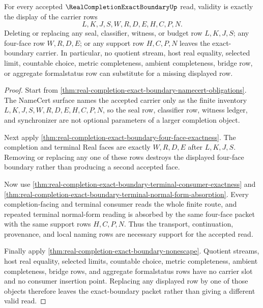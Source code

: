 \begin{theorem}
\label{thm:real-completion-exact-boundary-all-rows-necessary}
For every accepted $\RealCompletionExactBoundaryUp$ read, validity is exactly
the display of the carrier rows
$$
L,K,J,S,W,R,D,E,H,C,P,N.
$$
Deleting or replacing any seal, classifier, witness, or budget row $L,K,J,S$;
any four-face row $W,R,D,E$; or any support row $H,C,P,N$ leaves the
exact-boundary carrier. In particular, no quotient stream, host real equality,
selected limit, countable choice, metric completeness, ambient completeness,
bridge row, or aggregate formalstatus row can substitute for a missing
displayed row.
\end{theorem}
\begin{proof}
Start from
\autoref{thm:real-completion-exact-boundary-namecert-obligations}. The
NameCert surface names the accepted carrier only as the finite inventory
$L,K,J,S,W,R,D,E,H,C,P,N$, so the seal row, classifier row, witness ledger,
and synchronizer are not optional parameters of a larger completion object.

Next apply
\autoref{thm:real-completion-exact-boundary-four-face-exactness}. The
completion and terminal Real faces are exactly $W,R,D,E$ after $L,K,J,S$.
Removing or replacing any one of these rows destroys the displayed four-face
boundary rather than producing a second accepted face.

Now use
\autoref{thm:real-completion-exact-boundary-terminal-consumer-exactness} and
\autoref{thm:real-completion-exact-boundary-terminal-normal-form-absorption}.
Every completion-facing and terminal consumer reads the whole finite route,
and repeated terminal normal-form reading is absorbed by the same four-face
packet with the same support rows $H,C,P,N$. Thus the transport,
continuation, provenance, and local naming rows are necessary support for the
accepted read.

Finally apply
\autoref{thm:real-completion-exact-boundary-nonescape}. Quotient streams, host
real equality, selected limits, countable choice, metric completeness, ambient
completeness, bridge rows, and aggregate formalstatus rows have no carrier
slot and no consumer insertion point. Replacing any displayed row by one of
those objects therefore leaves the exact-boundary packet rather than giving a
different valid read.
\end{proof}

